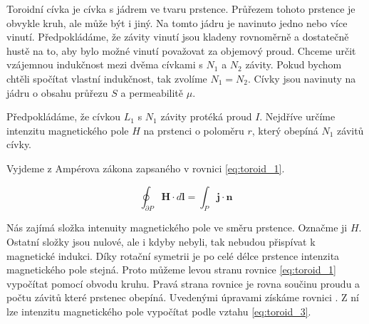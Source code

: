 \documentclass{book}
\newcommand{\vect}[1]{\boldsymbol{#1}}
\begin{document}
Toroidní cívka je cívka s jádrem ve tvaru prstence. Průřezem tohoto prstence je obvykle kruh, ale může být i jiný. Na tomto jádru je navinuto jedno nebo více vinutí. Předpokládáme,
že závity vinutí jsou kladeny rovnoměrně a dostatečně hustě na to, aby bylo možné vinutí považovat za objemový proud. Chceme určit vzájemnou indukčnost mezi dvěma cívkami s \(N_1\)
a \(N_2\) závity. Pokud bychom chtěli spočítat vlastní indukčnost, tak zvolíme \(N_1 = N_2\). Cívky jsou navinuty na jádru o obsahu průřezu \(S\) a permeabilitě \(\mu\).

Předpokládáme, že cívkou \(L_1\) s \(N_1\) závity protéká proud \(I\). Nejdříve určíme intenzitu magnetického pole \(H\) na prstenci o poloměru \(r\), který obepíná \(N_1\) závitů cívky.


Vyjdeme z Ampérova zákona zapsaného v rovnici \eqref{eq:toroid_1}.

\begin{equation}
\label{eq:toroid_1}
\oint_{\partial P} \vect{H} \cdot d\vect{l} = \int_P \vect{j} \cdot \vect{n}
\end{equation}

Nás zajímá složka intenuity magnetického pole ve směru prstence. Označme ji \(H\). Ostatní složky jsou nulové, ale i kdyby nebyli, tak nebudou přispívat k magnetické indukci. Díky rotační symetrii je po celé délce prstence
intenzita magnetického pole stejná. Proto můžeme levou stranu rovnice \eqref{eq:toroid_1} vypočítat pomocí obvodu kruhu. Pravá strana rovnice je rovna součinu proudu a počtu závitů které prstenec obepíná.
Uvedenými úpravami získáme rovnici \label{eq:toroid_2}. Z ní lze intenzitu magnetického pole vypočítat podle vztahu \eqref{eq:toroid_3}.
\end{document}

